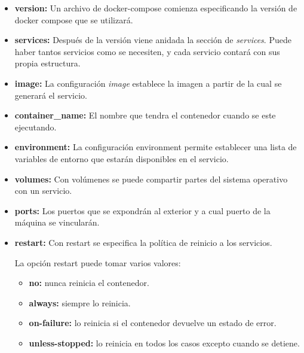					\begin{itemize}
						
						\item \textbf{version:} Un archivo de docker-compose comienza especificando la versión de docker compose que se utilizará.
							
						\item \textbf{services:} Después de la versión viene anidada la sección de \textit{services}. Puede haber tantos servicios como se necesiten, y cada servicio contará con sus propia estructura.
						
						\item \textbf{image:} La configuración \textit{image} establece la imagen a partir de la cual se generará el servicio.
						
						\item \textbf{container\_name:} El nombre que tendra el contenedor cuando se este ejecutando.
						
						\item \textbf{environment:} La configuración environment permite establecer una lista de variables de entorno que estarán disponibles en el servicio.
						
						\item \textbf{volumes:} Con volúmenes se puede compartir partes del sistema operativo con un servicio.
						
						\item \textbf{ports:} Los puertos que se expondrán al exterior y a cual puerto de la máquina se vincularán.
						
						\item \textbf{restart:}	Con restart se especifica la política de reinicio a los servicios.
						
						La opción restart puede tomar varios valores:
					
						\begin{itemize}
							
							\item \textbf{no:} nunca reinicia el contenedor.
							
							\item \textbf{always:} siempre lo reinicia.
							
							\item \textbf{on-failure:} lo reinicia si el contenedor devuelve un estado de error.
							
							\item \textbf{unless-stopped:} lo reinicia en todos los casos excepto cuando se detiene.
						
						\end{itemize}
						
					\end{itemize}
				
